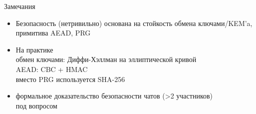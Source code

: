 \documentclass[usenames,dvipsnames,8pt,aspectratio=169]{beamer}
\begin{document}
\begin{frame}{Замечания}
\Large

\begin{itemize}
	\itemsep 10pt
	\item Безопасность (нетривильно) основана на стойкость {\color{Orange} обмена ключами/KEM'a,} примитива {\color{Orange} AEAD},  {\color{Orange} PRG} 
	\item На практике \\
	\hspace{10pt} обмен ключами: Диффи-Хэллман на эллиптической кривой \\[3pt]
	\hspace{10pt} AEAD:  CBC + HMAC \\[3pt]
	\hspace{10pt} вместо PRG используется SHA-256 \\
	\item формальное доказательство безопасности чатов (>2 участников) \\ под вопросом
\end{itemize}
\end{frame}
\end{document}
